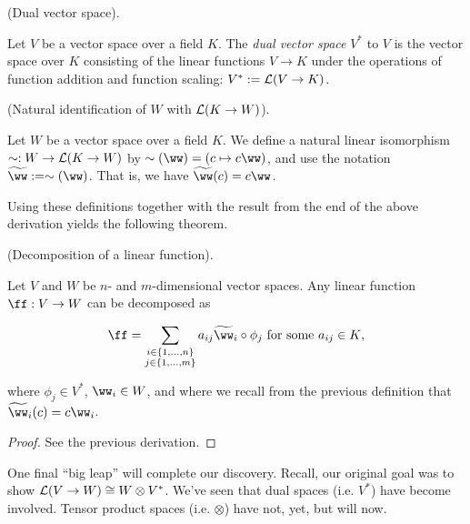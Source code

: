 \begin{defn}
\label{ch::motivated_intro::defn::dual_space_1}
    (Dual vector space).
    
    Let $V$ be a vector space over a field $K$. The \textit{dual vector space} $V^*$ to $V$ is the vector space over $K$ consisting of the linear functions $V \rightarrow K$ under the operations of function addition and function scaling: $V^* := \mathcal{L}(V \rightarrow K)$.
\end{defn}

\begin{defn}
\label{ch::lin_alg::defn::iso_V_to_linear_functions_K_V}
    (Natural identification of $W$ with $\mathcal{L}(K \rightarrow W)$).

    Let $W$ be a vector space over a field $K$. We define a natural linear isomorphism $\sim:W \rightarrow \mathcal{L}(K \rightarrow W)$ by $\sim(\ww) = (c \mapsto c\ww)$, and use the notation $\tww := \sim(\ww)$. That is, we have $\tww(c) = c\ww$.
\end{defn}

Using these definitions together with the result from the end of the above derivation yields the following theorem.

\begin{theorem}
    (Decomposition of a linear function).
    
    Let $V$ and $W$ be $n$- and $m$-dimensional vector spaces. Any linear function $\ff:V \rightarrow W$ can be decomposed as
    
    \begin{align*}
        \ff = \sum_{\substack{i \in \{1, ..., n\} \\ j \in \{1, ..., m\}}} a_{ij} \tww_i \circ \phi_j \text{ for some $a_{ij} \in K$},
    \end{align*}
    
    where $\phi_j \in V^*$, $\ww_i \in W$, and where we recall from the previous definition that $\tww_i(c) = c\ww_i$.
\end{theorem}

\begin{proof}
    See the previous derivation.
\end{proof}

One final ``big leap'' will complete our discovery. Recall, our original goal was to show ${\mathcal{L}(V \rightarrow W) \cong W \otimes V^*}$. We've seen that dual spaces (i.e. $V^*$) have become involved. Tensor product spaces (i.e. $\otimes$) have not, yet, but will now.

